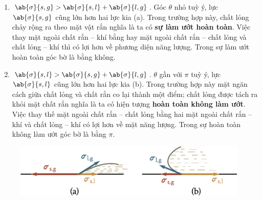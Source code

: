 \begin{enumerate}[1.]

    \item $\ab{\sigma}{s,g}>\ab{\sigma}{s,l}+\ab{\sigma}{l,g}$. Góc $\theta$ nhỏ tuỳ ý, lực $\ab{\sigma}{s,g}$ cũng lớn hơn hai lực kia (a). Trong trường hợp này, chất lỏng chảy rộng ra theo mặt vật rắn nghĩa là ta có \textbf{sự làm ướt hoàn toàn}. Việc thay mặt ngoài chất rắn -- khí bằng hay mặt ngoài chất rắn -- chất lỏng và chất lỏng -- khí thì có lợi hơn về phương diện năng lượng. Trong sự làm ướt hoàn toàn góc bờ là bằng không.
	

    \item $\ab{\sigma}{s,l}>\ab{\sigma}{s,g}+\ab{\sigma}{l,g}$. $\theta$ gần với $\pi$ tuỳ ý, lực $\ab{\sigma}{s,l}$ cũng lớn hơn hai lực kia (b). Trong trường hợp này mặt ngăn cách giữa chất lỏng và chất rắn co lại thành một điểm; chất lỏng được tách ra khỏi mặt chất rắn nghĩa là ta có hiện tượng \textbf{hoàn toàn không làm ướt}. Việc thay thế mặt ngoài chất rắn -- chất lỏng bằng hai mặt ngoài chất rắn -- khí và chất lỏng -- khí có lợi hơn về mặt năng lượng. Trong sự hoàn toàn không làm ướt góc bờ là bằng $\pi$.
    
\end{enumerate}

\begin{figure}[!htb]
	\begin{center}
		\includegraphics[scale=1.1]{figures/ch_14/fig_14_8.pdf}
		\caption[]{}
		\label{fig:14_8}
	\end{center}
	\vspace{-0.75cm}
\end{figure}

